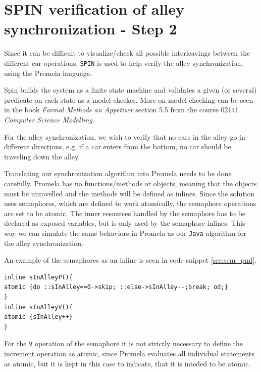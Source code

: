 \section{SPIN verification of alley synchronization - Step 2}

Since it can be difficult to visualize/check all possible interleavings between the different car operations, \texttt{SPIN} \cite{spin} is used to help verify the alley synchronization, using the Promela language.

Spin builds the system as a finite state machine and validates a given (or several) predicate on each state as a model checker. More on model checking can be seen in the book \textit{Formal Methods an Appetizer} \cite{formalmethods} section 5.5 from the course 02141 \textit{Computer Science Modelling}.

For the alley synchronization, we wish to verify that no cars in the alley go in different directions, e.g. if a car enters from the bottom, no car should be traveling down the alley.

Translating our synchronization algorithm into Promela needs to be done carefully. Promela has no functions/methods or objects, meaning that the objects must be unravelled and the methods will be defined as inlines. Since the solution uses semaphores, which are defined to work atomically, the semaphore operations are set to be atomic. The inner resources handled by the semaphore has to be declared as exposed variables, but is only used by the semaphore inlines. This way we can simulate the same behaviors in Promela as our \texttt{Java} algorithm for the alley synchronization.

An example of the semaphores as an inline is seen in code snippet \ref{src:sem_pml}.
\begin{lstlisting}[language=promela, caption=Semaphore protocol in Promela, label=src:sem_pml]
inline sInAlleyP(){
atomic {do ::sInAlley==0->skip; ::else->sInAlley--;break; od;}
}
inline sInAlleyV(){
atomic {sInAlley++}
}
\end{lstlisting} 

For the \texttt{V} operation of the semaphore it is not strictly necessary to define the increment operation as atomic, since Promela evaluates all individual statements as atomic, but it is kept in this case to indicate, that it is inteded to be atomic.

